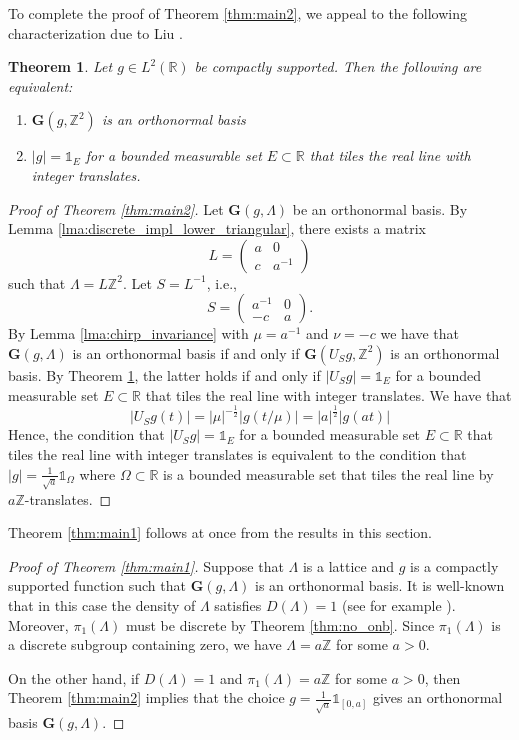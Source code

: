 \documentclass[reqno,a4paper,12pt]{amsart}
\numberwithin{equation}{section}
\newtheorem{theorem}[definition]{Theorem}
\def\Z{{\mathbb Z}}
\def\R{{\mathbb R}}
\newcommand{\lt}{{L^2(\R)}}
\newcommand\1{\mathds{1}}
\begin{document}
To complete the proof of Theorem \ref{thm:main2}, we appeal to the following characterization due to Liu \cite{L01}.

\begin{theorem}\label{thm:liu}
    Let $g \in \lt$ be compactly supported. Then the following are equivalent:
    \begin{enumerate}
        \item $\mathbf{G}(g,\Z^2)$ is an orthonormal basis
        \item $|g|=\1_E$ for a bounded measurable set $E \subset \R$ that tiles the real line with integer translates.
    \end{enumerate}
\end{theorem}
\begin{proof}[Proof of Theorem \ref{thm:main2}]
    Let $\mathbf{G}(g,\Lambda)$ be an orthonormal basis. By Lemma \ref{lma:discrete_impl_lower_triangular}, there exists a matrix
    $$
    L = \begin{pmatrix}
        a & 0 \\ c & a^{-1}
    \end{pmatrix}
    $$
    such that $\Lambda = L \Z^2$. Let $S = L^{-1}$, i.e.,
    $$
    S = \begin{pmatrix}
        a^{-1} & 0 \\ -c & a
    \end{pmatrix}.
    $$
    By Lemma \ref{lma:chirp_invariance} with $\mu = a^{-1}$ and $\nu = -c$ we have that $\mathbf{G}(g,\Lambda)$ is an orthonormal basis if and only if $\mathbf{G}(U_Sg,\Z^2)$ is an orthonormal basis. By Theorem \ref{thm:liu}, the latter holds if and only if $|U_S g|=\1_E$ for a bounded measurable set $E \subset \R$ that tiles the real line with integer translates. We have that
    $$
    |U_S g(t)| = |\mu|^{-\frac12} |g(t/\mu)| = |a|^{\frac12} |g(at)|
    $$
    Hence, the condition that $|U_S g|=\1_E$ for a bounded measurable set $E \subset \R$ that tiles the real line with integer translates is equivalent to the condition that
    $
    |g| = \frac{1}{\sqrt{a}} \1_\Omega
    $
    where $\Omega \subset \R$ is a bounded measurable set that tiles the real line by $a\Z$-translates.
\end{proof}

Theorem \ref{thm:main1} follows at once from the results in this section.

\begin{proof}[Proof of Theorem \ref{thm:main1}]
    Suppose that $\Lambda$ is a lattice and $g$ is a compactly supported function such that $\mathbf{G}(g,\Lambda)$ is an orthonormal basis. It is well-known that in this case the density of $\Lambda$ satisfies $D(\Lambda)=1$ (see for example \cite{IM18}). Moreover, $\pi_1(\Lambda)$ must be discrete by Theorem \ref{thm:no_onb}. Since $\pi_1(\Lambda)$ is a discrete subgroup containing zero, we have $\Lambda = a \Z$ for some $a>0$.

    On the other hand, if $D(\Lambda)=1$ and  $\pi_1(\Lambda)=a\Z$ for some $a>0$, then Theorem \ref{thm:main2} implies that the choice $g = \frac{1}{\sqrt{a}} \1_{[0,a]}$ gives an orthonormal basis $\mathbf{G}(g,\Lambda)$.
\end{proof}
\end{document}
